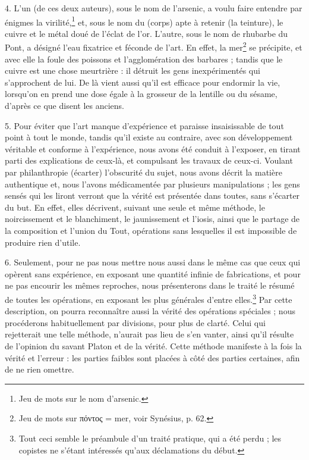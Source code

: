 \documentclass[a4paper, 11pt, oneside, polutonikogreek, french]{article}
\begin{document}
4. L'un (de ces deux auteurs), sous le nom de l'arsenic, a voulu faire entendre par énigmes la virilité,\footnote{Jeu de mots sur le nom d'arsenic.} et, sous le nom du (corps) apte à retenir (la teinture), le cuivre et le métal doué de l'éclat de l'or. L'autre, sous le nom de rhubarbe du Pont, a désigné l'eau fixatrice et féconde de l'art. En effet, la mer\footnote{Jeu de mots sur πόντος = mer, voir Synésius, p. 62.} se précipite, et avec elle la foule des poissons et l'agglomération des barbares ; tandis que le cuivre est une chose meurtrière : il détruit les gens inexpérimentés qui s'approchent de lui. De là vient aussi qu'il est efficace pour endormir la vie, lorsqu'on en prend une dose égale à la grosseur de la lentille ou du sésame, d'après ce que disent les anciens.

5. Pour éviter que l'art manque d'expérience et paraisse insaisissable de tout point à tout le monde, tandis qu'il existe au contraire, avec son développement véritable et conforme à l'expérience, nous avons été conduit à l'exposer, en tirant parti des explications de ceux-là, et compulsant les travaux de ceux-ci. Voulant par philanthropie (écarter) l'obscurité du sujet, nous avons décrit la matière authentique et, nous l'avons médicamentée par plusieurs manipulations ; les gens sensés qui les liront verront que la vérité est présentée dans toutes, sans s'écarter du but. En effet, elles décrivent, suivant une seule et même méthode, le noircissement et le blanchiment, le jaunissement et l'iosis, ainsi que le partage de la composition et l'union du Tout, opérations sans lesquelles il est impossible de produire rien d'utile.

6. Seulement, pour ne pas nous mettre nous aussi dans le même cas que ceux qui opèrent sans expérience, en exposant une quantité infinie de fabrications, et pour ne pas encourir les mêmes reproches, nous présenterons dans le traité le résumé de toutes les opérations, en exposant les plus générales d'entre elles.\footnote{Tout ceci semble le préambule d'un traité pratique, qui a été perdu ; les copistes ne s'étant intéressés qu'aux déclamations du début.} Par cette description, on pourra reconnaître aussi la vérité des opérations spéciales ; nous procéderons habituellement par divisions, pour plus de clarté. Celui qui rejetterait une telle méthode, n'aurait pas lieu de s'en vanter, ainsi qu'il résulte de l'opinion du savant Platon et de la vérité. Cette méthode manifeste à la fois la vérité et l'erreur : les parties faibles sont placées à côté des parties certaines, afin de ne rien omettre.
\end{document}
